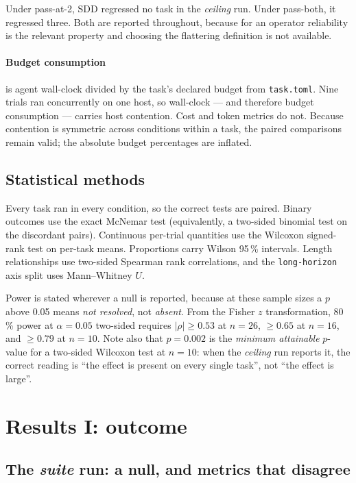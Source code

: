 \documentclass[11pt,a4paper]{article}
\newcommand{\code}[1]{\texttt{\small #1}}
\begin{document}
Under pass-at-2, SDD regressed no task in the \emph{ceiling} run. Under pass-both, it
regressed three. Both are reported throughout, because for an operator reliability is the
relevant property and choosing the flattering definition is not available.

\paragraph{Budget consumption} is agent wall-clock divided by the task's declared budget from
\code{task.toml}. Nine trials ran concurrently on one host, so wall-clock --- and therefore
budget consumption --- carries host contention. Cost and token metrics do not. Because
contention is symmetric across conditions within a task, the paired comparisons remain valid;
the absolute budget percentages are inflated.

\subsection{Statistical methods}

Every task ran in every condition, so the correct tests are paired. Binary outcomes use the
exact McNemar test (equivalently, a two-sided binomial test on the discordant pairs).
Continuous per-trial quantities use the Wilcoxon signed-rank test on per-task means.
Proportions carry Wilson 95\,\% intervals. Length relationships use two-sided Spearman rank
correlations, and the \code{long-horizon} axis split uses Mann--Whitney $U$.

Power is stated wherever a null is reported, because at these sample sizes a $p$ above 0.05
means \emph{not resolved}, not \emph{absent}. From the Fisher $z$ transformation, 80\,\% power
at $\alpha = 0.05$ two-sided requires $|\rho| \ge 0.53$ at $n = 26$, $\ge 0.65$ at $n = 16$,
and $\ge 0.79$ at $n = 10$. Note also that $p = 0.002$ is the \emph{minimum attainable}
$p$-value for a two-sided Wilcoxon test at $n = 10$: when the \emph{ceiling} run reports it,
the correct reading is ``the effect is present on every single task'', not ``the effect is
large''.

\clearpage
\section{Results I: outcome}
\label{sec:outcome}

\subsection{The \emph{suite} run: a null, and metrics that disagree}
\end{document}
